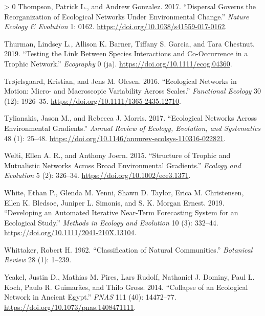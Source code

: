 \documentclass[11pt]{article}
\newlength{\cslhangindent}
\newenvironment{CSLReferences}[3] %
 {%
  \setlength{\parindent}{0pt}
  \ifodd #1 \everypar{\setlength{\hangindent}{\cslhangindent}}\ignorespaces\fi
  \ifnum #2 > 0
  \setlength{\parskip}{#2\baselineskip}
  \fi
 }%
 {}
\begin{document}
\begin{CSLReferences}{1}{0}
\leavevmode\hypertarget{ref-Thompson2017DisGov}{}%
Thompson, Patrick L., and Andrew Gonzalez. 2017. {``Dispersal Governs
the Reorganization of Ecological Networks Under Environmental Change.''}
\emph{Nature Ecology \& Evolution} 1: 0162.
\url{https://doi.org/10.1038/s41559-017-0162}.

\leavevmode\hypertarget{ref-Thurman2019TesLin}{}%
Thurman, Lindsey L., Allison K. Barner, Tiffany S. Garcia, and Tara
Chestnut. 2019. {``Testing the Link Between Species Interactions and
Co-Occurrence in a Trophic Network.''} \emph{Ecography} 0 (ja).
\url{https://doi.org/10.1111/ecog.04360}.

\leavevmode\hypertarget{ref-Trojelsgaard2016EcoNet}{}%
Trøjelsgaard, Kristian, and Jens M. Olesen. 2016. {``Ecological Networks
in Motion: Micro- and Macroscopic Variability Across Scales.''}
\emph{Functional Ecology} 30 (12): 1926--35.
\url{https://doi.org/10.1111/1365-2435.12710}.

\leavevmode\hypertarget{ref-Tylianakis2017EcoNet}{}%
Tylianakis, Jason M., and Rebecca J. Morris. 2017. {``Ecological
Networks Across Environmental Gradients.''} \emph{Annual Review of
Ecology, Evolution, and Systematics} 48 (1): 25--48.
\url{https://doi.org/10.1146/annurev-ecolsys-110316-022821}.

\leavevmode\hypertarget{ref-Welti2015StrTro}{}%
Welti, Ellen A. R., and Anthony Joern. 2015. {``Structure of Trophic and
Mutualistic Networks Across Broad Environmental Gradients.''}
\emph{Ecology and Evolution} 5 (2): 326--34.
\url{https://doi.org/10.1002/ece3.1371}.

\leavevmode\hypertarget{ref-White2019DevAut}{}%
White, Ethan P., Glenda M. Yenni, Shawn D. Taylor, Erica M. Christensen,
Ellen K. Bledsoe, Juniper L. Simonis, and S. K. Morgan Ernest. 2019.
{``Developing an Automated Iterative Near-Term Forecasting System for an
Ecological Study.''} \emph{Methods in Ecology and Evolution} 10 (3):
332--44. \url{https://doi.org/10.1111/2041-210X.13104}.

\leavevmode\hypertarget{ref-Whittaker1962ClaNat}{}%
Whittaker, Robert H. 1962. {``Classification of Natural Communities.''}
\emph{Botanical Review} 28 (1): 1--239.

\leavevmode\hypertarget{ref-Yeakel2014ColEco}{}%
Yeakel, Justin D., Mathias M. Pires, Lars Rudolf, Nathaniel J. Dominy,
Paul L. Koch, Paulo R. Guimarães, and Thilo Gross. 2014. {``Collapse of
an Ecological Network in Ancient Egypt.''} \emph{PNAS} 111 (40):
14472--77. \url{https://doi.org/10.1073/pnas.1408471111}.


\end{CSLReferences}
\end{document}
